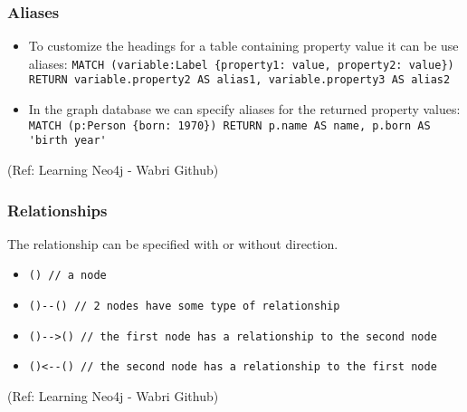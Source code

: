 \begin{frame}\frametitle{Aliases }

\begin{itemize}
\item To customize the headings for a table containing property value it can be use aliases: \lstinline|MATCH (variable:Label {property1: value, property2: value}) RETURN variable.property2 AS alias1, variable.property3 AS alias2|
\item In the graph database we can specify aliases for the returned property values: \lstinline|MATCH (p:Person {born: 1970}) RETURN p.name AS name, p.born AS 'birth year'|
\end{itemize}


{\tiny (Ref: Learning Neo4j - Wabri Github)}
\end{frame}

\begin{frame}\frametitle{Relationships}

The relationship can be specified with or without direction.

\begin{itemize}
\item \lstinline|() // a node|
\item \lstinline|()--() // 2 nodes have some type of relationship|
\item \lstinline|()-->() // the first node has a relationship to the second node|
\item \lstinline|()<--() // the second node has a relationship to the first node |
\end{itemize}

{\tiny (Ref: Learning Neo4j - Wabri Github)}
\end{frame}

